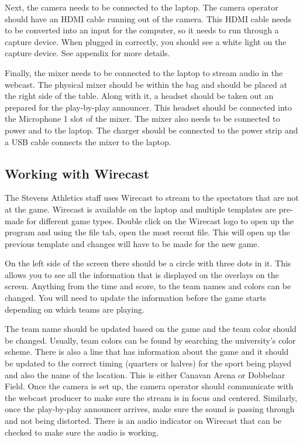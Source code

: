 \documentclass{article}
\begin{document}
Next, the camera needs to be connected to the laptop. The camera operator should have an HDMI cable running out of the camera. This HDMI cable needs to be converted into an input for the computer, so it needs to run through a capture device. When plugged in correctly, you should see a white light on the capture device. See appendix for more details.


Finally, the mixer needs to be connected to the laptop to stream audio in the webcast. The physical mixer should be within the bag and should be placed at the right side of the table. Along with it, a headset should be taken out an prepared for the play-by-play announcer. This headset should be connected into the Microphone 1 slot of the mixer. The mixer also needs to be connected to power and to the laptop. The charger should be connected to the power strip and a USB cable connects the mixer to the laptop. 


\subsection{Working with Wirecast}
The Stevens Athletics staff uses Wirecast to stream to the spectators that are not at the game. Wirecast is available on the laptop and multiple templates are pre-made for different game types. Double click on the Wirecast logo to open up the program and using the file tab, open the most recent file. This will open up the previous template and changes will have to be made for the new game.


On the left side of the screen there should be a circle with three dots in it. This allows you to see all the information that is displayed on the overlays on the screen. Anything from the time and score, to the team names and colors can be changed. You will need to update the information before the game starts depending on which teams are playing. 
\newline 

The team name should be updated based on the game and the team color should be changed. Usually, team colors can be found by searching the university’s color scheme. There is also a line that has information about the game and it should be updated to the correct timing (quarters or halves) for the sport being played and also the name of the location. This is either Canavan Arena or Dobbelaar Field. Once the camera is set up, the camera operator should communicate with the webcast producer to make sure the stream is in focus and centered. Similarly, once the play-by-play announcer arrives, make sure the sound is passing through and not being distorted. There is an audio indicator on Wirecast that can be checked to make sure the audio is working. 
\end{document}
